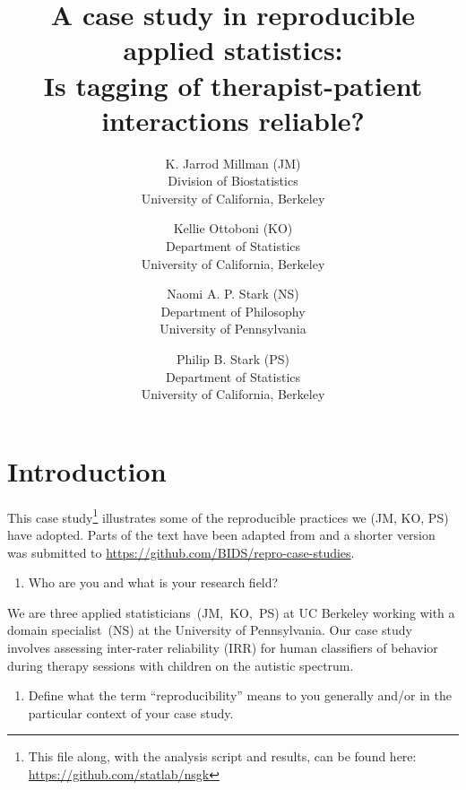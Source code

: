 \documentclass[]{article}
\date{}
\begin{document}
\title{A case study in reproducible applied statistics:\\
Is tagging of therapist-patient interactions reliable?
}

\author{K. Jarrod Millman (JM)\\ Division of Biostatistics\\ University of California, Berkeley \and
Kellie Ottoboni (KO)\\ Department of Statistics\\ University of California, Berkeley \and
Naomi A. P. Stark (NS)\\ Department of Philosophy\\ University of Pennsylvania \and
Philip B. Stark (PS)\\ Department of Statistics\\ University of California, Berkeley
}

\maketitle


\section{Introduction}

This case study\footnote{This file along, with the analysis script and results,
can be found here: \url{https://github.com/statlab/nsgk}}
illustrates some of
the reproducible practices we (JM, KO, PS) have adopted.
Parts of the text have been adapted from \citet{millman2015thesis} and a
shorter version was submitted to
\url{https://github.com/BIDS/repro-case-studies}.


\begin{enumerate}
\def\labelenumi{\arabic{enumi})}
\itemsep1pt\parskip0pt
\item
  Who are you and what is your research field?
\end{enumerate}

We are three applied statisticians~(JM,~KO,~PS) at UC Berkeley working with a
domain specialist~(NS) at the University of Pennsylvania.
Our case study involves assessing inter-rater reliability (IRR) for human
classifiers of behavior during therapy sessions with children on the autistic spectrum.

\begin{enumerate}
\def\labelenumi{\arabic{enumi})}
\setcounter{enumi}{1}
\itemsep1pt\parskip0pt
\item
  Define what the term ``reproducibility'' means to you generally and/or
  in the particular context of your case study.
\end{enumerate}
\end{document}
